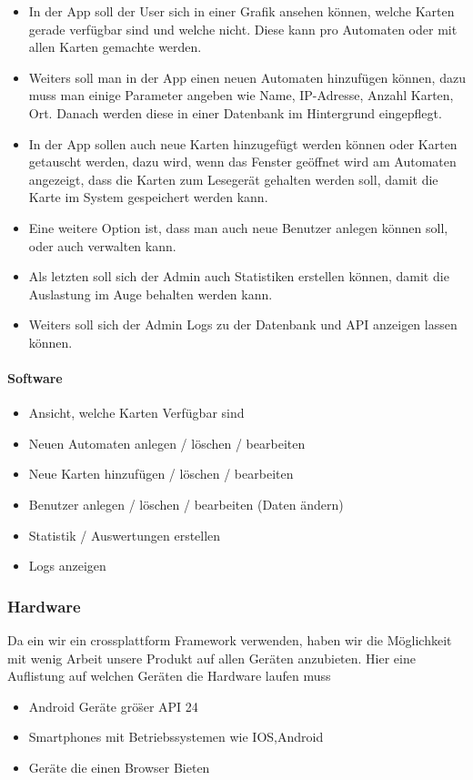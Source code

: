 \documentclass[a4paper]{article}
\begin{document}
\begin{itemize}
  \item In der App soll der User sich in einer Grafik ansehen können, welche Karten gerade verfügbar sind und welche nicht. Diese kann pro Automaten oder mit allen Karten gemachte werden. 
  \item Weiters soll man in der App einen neuen Automaten hinzufügen können, dazu muss man einige Parameter angeben wie Name, IP-Adresse, Anzahl Karten, Ort. Danach werden diese in einer Datenbank im Hintergrund eingepflegt. 
  \item In der App sollen auch neue Karten hinzugefügt werden können oder Karten getauscht werden, dazu wird, wenn das Fenster geöffnet wird am Automaten angezeigt, dass die Karten zum Lesegerät gehalten werden soll, damit die Karte im System gespeichert werden kann.
  \item Eine weitere Option ist, dass man auch neue Benutzer anlegen können soll, oder auch verwalten kann.
  \item Als letzten soll sich der Admin auch Statistiken erstellen können, damit die Auslastung im Auge behalten werden kann.
  \item Weiters soll sich der Admin Logs zu der Datenbank und API anzeigen lassen können.
\end{itemize}

\paragraph{Software}
\begin{itemize}
 \item Ansicht, welche Karten Verfügbar sind
 \item Neuen Automaten anlegen / löschen / bearbeiten 
 \item Neue Karten hinzufügen / löschen / bearbeiten
 \item Benutzer anlegen / löschen / bearbeiten (Daten ändern)
 \item Statistik / Auswertungen erstellen
 \item Logs anzeigen
\end{itemize}

\subsubsection{Hardware}
Da ein wir ein crossplattform Framework verwenden, haben wir die M\"oglichkeit mit wenig Arbeit unsere Produkt auf allen Ger\"aten anzubieten. Hier eine Auflistung auf welchen Ger\"aten die Hardware laufen muss
\begin{itemize}
  \item Android Geräte grö\"ser API 24
  \item Smartphones mit Betriebssystemen wie IOS,Android
  \item Geräte die einen Browser Bieten
\end{itemize}
\end{document}
